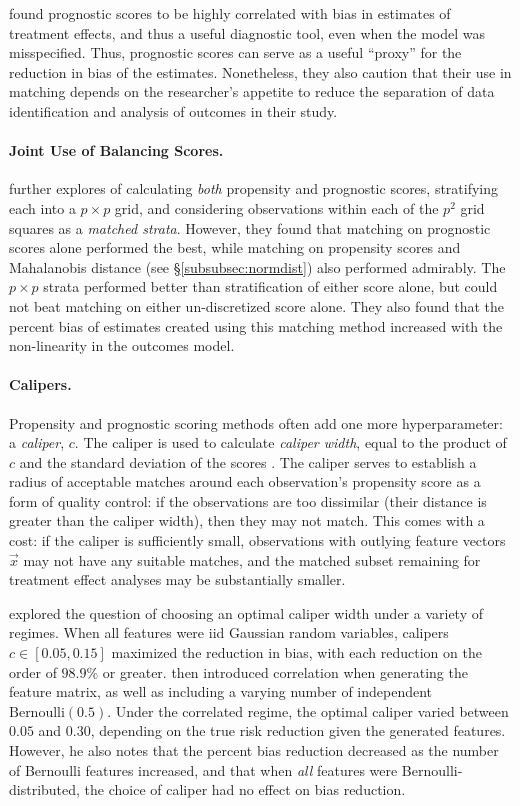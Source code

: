 \documentclass[11pt]{extarticle}
\begin{document}
\textcite{stuart_prognostic_2013} found prognostic scores to be highly correlated with bias in estimates of treatment effects, and thus a useful diagnostic tool, even when the model was misspecified. Thus, prognostic scores can serve as a useful ``proxy'' for the reduction in bias of the estimates. Nonetheless, they also caution that their use in matching depends on the researcher's appetite to reduce the separation of data identification and analysis of outcomes in their study.

\paragraph{Joint Use of Balancing Scores.} \textcite{leacy_joint_2014} further explores of calculating \emph{both} propensity and prognostic scores, stratifying each into a $p \times p$ grid, and considering observations within each of the $p^2$ grid squares as a \emph{matched strata}. However, they found that matching on prognostic scores alone performed the best, while matching on propensity scores and Mahalanobis distance (see \S\ref{subsubsec:normdist}) also performed admirably. The $p \times p$ strata performed better than stratification of either score alone, but could not beat matching on either un-discretized score alone. They also found that the percent bias of estimates created using this matching method increased with the non-linearity in the outcomes model.

\paragraph{Calipers.} Propensity and prognostic scoring methods often add one more hyperparameter: a \emph{caliper}, $c$. The caliper is used to calculate \emph{caliper width}, equal to the product of $c$ and the standard deviation of the scores \parencite{ho_matchit_2011}.
The caliper serves to establish a radius of acceptable matches around each observation's propensity score as a form of quality control: if the observations are too dissimilar (their distance is greater than the caliper width), then they may not match.
This comes with a cost: if the caliper is sufficiently small, observations with outlying feature vectors $\vec{x}$ may not have any suitable matches, and the matched subset remaining for treatment effect analyses may be substantially smaller.

\textcite{austin_optimal_2011} explored the question of choosing an optimal caliper width under a variety of regimes. When all features were iid Gaussian random variables, calipers $c \in [0.05, 0.15]$ maximized the reduction in bias, with each reduction on the order of $98.9\%$ or greater. \citeauthor{austin_optimal_2011} then introduced correlation when generating the feature matrix, as well as including a varying number of independent $\text{Bernoulli}(0.5)$. Under the correlated regime, the optimal caliper varied between $0.05$ and $0.30$, depending on the true risk reduction given the generated features. However, he also notes that the percent bias reduction decreased as the number of Bernoulli features increased, and that when \emph{all} features were Bernoulli-distributed, the choice of caliper had no effect on bias reduction.
\end{document}
